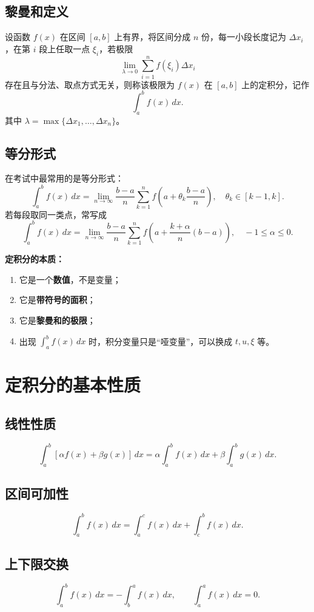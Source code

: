 \documentclass[12pt,a4paper]{ctexart}
\begin{document}
\subsection{黎曼和定义}
设函数 $f(x)$ 在区间 $[a,b]$ 上有界，将区间分成 $n$ 份，每一小段长度记为 $\Delta x_i$，在第 $i$ 段上任取一点 $\xi_i$，若极限
\[
\lim_{\lambda\to 0}\sum_{i=1}^n f(\xi_i)\Delta x_i
\]
存在且与分法、取点方式无关，则称该极限为 $f(x)$ 在 $[a,b]$ 上的定积分，记作
\[
\int_a^b f(x)\,dx.
\]
其中 $\lambda=\max\{\Delta x_1,\dots,\Delta x_n\}$。

\subsection{等分形式}
在考试中最常用的是等分形式：
\[
\int_a^b f(x)\,dx
=
\lim_{n\to\infty}\frac{b-a}{n}\sum_{k=1}^n
f\!\left(a+\theta_k\frac{b-a}{n}\right),
\quad \theta_k\in[k-1,k].
\]
若每段取同一类点，常写成
\[
\int_a^b f(x)\,dx
=
\lim_{n\to\infty}\frac{b-a}{n}\sum_{k=1}^n
f\!\left(a+\frac{k+\alpha}{n}(b-a)\right),
\quad -1\le \alpha\le 0.
\]

\begin{keybox}
\textbf{定积分的本质：}
\begin{enumerate}
  \item 它是一个\textbf{数值}，不是变量；
  \item 它是\textbf{带符号的面积}；
  \item 它是\textbf{黎曼和的极限}；
  \item 出现 $\int_a^b f(x)\,dx$ 时，积分变量只是“哑变量”，可以换成 $t,u,\xi$ 等。
\end{enumerate}
\end{keybox}

\section{定积分的基本性质}

\subsection{线性性质}
\[
\int_a^b [\alpha f(x)+\beta g(x)]\,dx
=
\alpha\int_a^b f(x)\,dx+\beta\int_a^b g(x)\,dx.
\]

\subsection{区间可加性}
\[
\int_a^b f(x)\,dx=\int_a^c f(x)\,dx+\int_c^b f(x)\,dx.
\]

\subsection{上下限交换}
\[
\int_a^b f(x)\,dx=-\int_b^a f(x)\,dx,\qquad
\int_a^a f(x)\,dx=0.
\]
\end{document}
